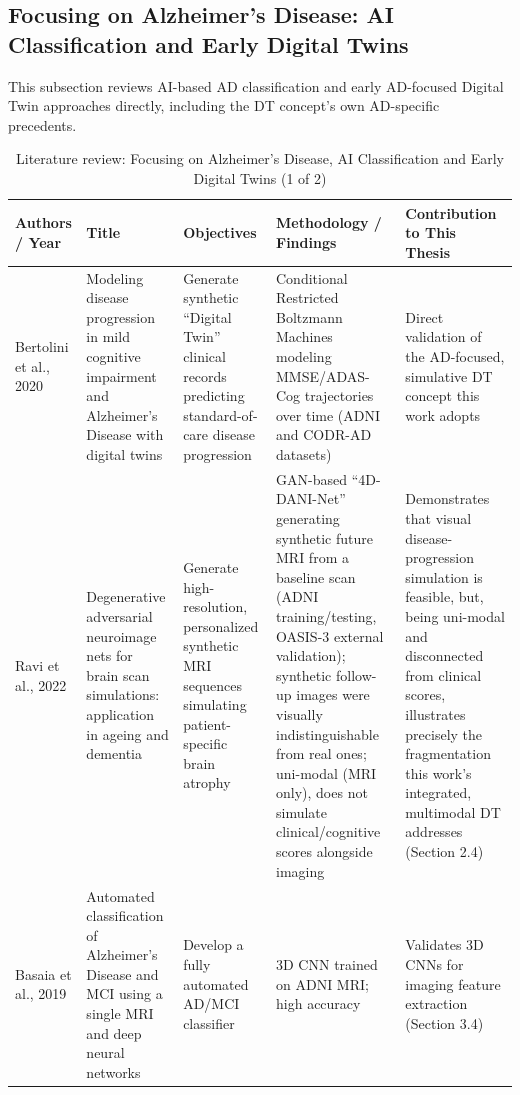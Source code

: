 \documentclass[pdflatex,sn-mathphys-num]{sn-jnl}%
\theoremstyle{thmstyleone}%
\theoremstyle{thmstyletwo}%
\theoremstyle{thmstylethree}%
\begin{document}
\subsection{Focusing on Alzheimer's Disease: AI Classification and Early Digital Twins}\label{sec2_3}

This subsection reviews AI-based AD classification and early AD-focused Digital Twin approaches directly, including the DT concept's own AD-specific precedents.

\begin{table}
\caption*{Literature review: Focusing on Alzheimer's Disease, AI Classification and Early Digital Twins (1 of 2)}\label{tabRW3a}
\scriptsize
\begin{tabular}{@{}p{0.10\textheight}p{0.17\textheight}p{0.15\textheight}p{0.27\textheight}p{0.18\textheight}@{}}
\toprule
\textbf{Authors / Year} & \textbf{Title} & \textbf{Objectives} & \textbf{Methodology / Findings} & \textbf{Contribution to This Thesis} \\
\midrule
Bertolini et al., 2020 \cite{bib10} & Modeling disease progression in mild cognitive impairment and Alzheimer's Disease with digital twins & Generate synthetic ``Digital Twin'' clinical records predicting standard-of-care disease progression & Conditional Restricted Boltzmann Machines modeling MMSE/ADAS-Cog trajectories over time (ADNI and CODR-AD datasets) & Direct validation of the AD-focused, simulative DT concept this work adopts \\
\addlinespace
Ravi et al., 2022 \cite{bib29} & Degenerative adversarial neuroimage nets for brain scan simulations: application in ageing and dementia & Generate high-resolution, personalized synthetic MRI sequences simulating patient-specific brain atrophy & GAN-based ``4D-DANI-Net'' generating synthetic future MRI from a baseline scan (ADNI training/testing, OASIS-3 external validation); synthetic follow-up images were visually indistinguishable from real ones; uni-modal (MRI only), does not simulate clinical/cognitive scores alongside imaging & Demonstrates that visual disease-progression simulation is feasible, but, being uni-modal and disconnected from clinical scores, illustrates precisely the fragmentation this work's integrated, multimodal DT addresses (Section 2.4) \\
\addlinespace
Basaia et al., 2019 \cite{bib12} & Automated classification of Alzheimer's Disease and MCI using a single MRI and deep neural networks & Develop a fully automated AD/MCI classifier & 3D CNN trained on ADNI MRI; high accuracy & Validates 3D CNNs for imaging feature extraction (Section 3.4) \\

\end{tabular}
\end{table}
\end{document}
